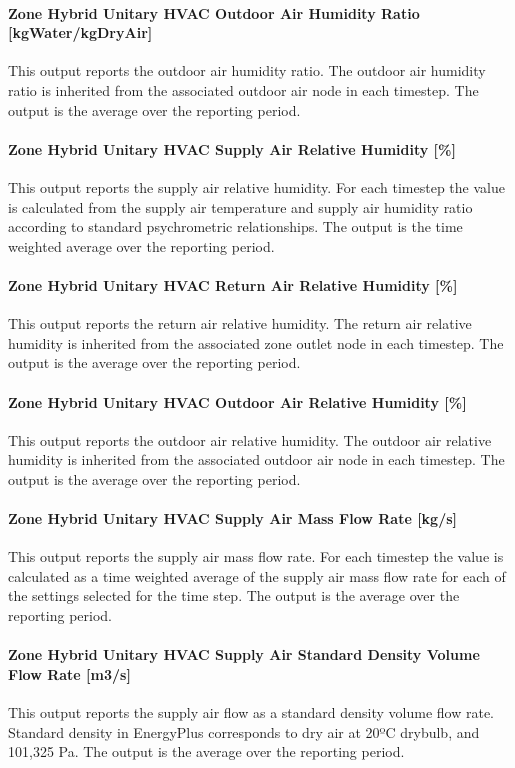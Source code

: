 \paragraph{Zone Hybrid Unitary HVAC Outdoor Air Humidity Ratio [kgWater/kgDryAir]}
This output reports the outdoor air humidity ratio.  The outdoor air humidity ratio is inherited from the associated outdoor air node in each timestep. The output is the average over the reporting period.

\paragraph{Zone Hybrid Unitary HVAC Supply Air Relative Humidity [\%]}
This output reports the supply air relative humidity. For each timestep the value is calculated  from the supply air temperature and supply air humidity ratio according to standard psychrometric relationships. The output is the time weighted average over the reporting period.

\paragraph{Zone Hybrid Unitary HVAC Return Air Relative Humidity [\%]}
This output reports the return air relative humidity. The return air relative humidity is inherited from the associated zone outlet node in each timestep. The output is the average over the reporting period.

\paragraph{Zone Hybrid Unitary HVAC Outdoor Air Relative Humidity [\%]}
This output reports the outdoor air relative humidity. The outdoor air relative humidity is inherited from the associated outdoor air node in each timestep. The output is the average over the reporting period.

\paragraph{Zone Hybrid Unitary HVAC Supply Air Mass Flow Rate [kg/s]}
This output reports the supply air mass flow rate. For each timestep the value is calculated as a time weighted average of the supply air mass flow rate for each of the settings selected for the time step. The output is the average over the reporting period.

\paragraph{Zone Hybrid Unitary HVAC Supply Air Standard Density Volume Flow Rate [m3/s]}
This output reports the supply air flow as a standard density volume flow rate. Standard density in EnergyPlus corresponds to dry air at 20ºC drybulb, and 101,325 Pa. The output is the average over the reporting period.

